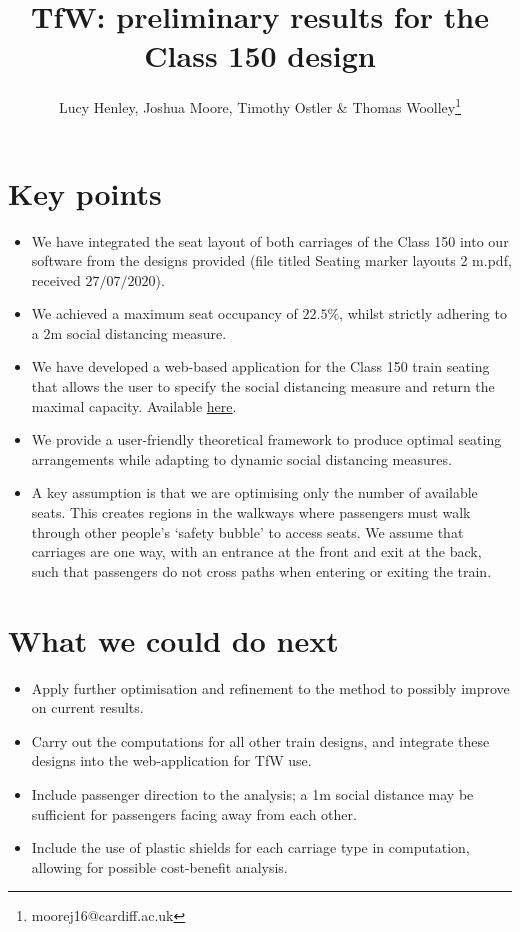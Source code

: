\documentclass[11pt,a4paper]{article}
\title{TfW: preliminary results for the Class 150 design}
\author{Lucy Henley, Joshua Moore, Timothy Ostler \& Thomas Woolley\footnote{moorej16@cardiff.ac.uk}}
\begin{document}
\maketitle

\section*{Key points}
\begin{itemize}

\item We have integrated the seat layout of both carriages of the Class 150 into our software from the designs provided (file titled Seating marker layouts 2 m.pdf, received $27/07/2020$).
\item We achieved a maximum seat occupancy of $22.5\%$, whilst strictly adhering to a $2$m social distancing measure.
\item We have developed a web-based application for the Class 150 train seating that allows the user to specify the social distancing measure and return the maximal capacity. Available \href{https://lucyhenley.shinyapps.io/TFW_socialdistancing/}{here}.
\item We provide a user-friendly theoretical framework to produce optimal seating arrangements while adapting to dynamic social distancing measures.
\item A key assumption is that we are optimising only the number of available seats. This creates regions in the walkways where passengers must walk through other people's `safety bubble' to access seats. We assume that carriages are one way, with an entrance at the front and exit at the back, such that passengers do not cross paths when entering or exiting the train.
\end{itemize}

\section*{What we could do next}
\begin{itemize}
\item Apply further optimisation and refinement to the method to possibly improve on current results.
\item Carry out the computations for all other train designs, and integrate these designs into the web-application for TfW use.
\item Include passenger direction to the analysis; a 1m social distance may be sufficient for passengers facing away from each other.
\item Include the use of plastic shields for each carriage type in computation, allowing for possible cost-benefit analysis.

\end{itemize}
\end{document}

